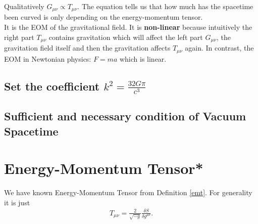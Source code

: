 \documentclass[openany,10pt]{book}
\theoremstyle{definition}
\theoremstyle{definition}
\theoremstyle{remark}
\newcommand{\be}{\begin{eqnarray}}
\newcommand{\ee}{\end{eqnarray}}
\begin{document}
Qualitatively $G_{\mu\nu}\varpropto T_{\mu\nu}$. The equation tells us that how much has the spacetime been curved is only depending on the energy-momentum tensor.\\
It is the EOM of the gravitational field. It is \textbf{non-linear} because intuitively the right part $T_{\mu\nu}$ contains gravitation which will affect the left part $G_{\mu\nu}$, the gravitation field itself and then the gravitation affects $T_{\mu\nu}$ again. In contrast, the EOM in Newtonian physics:  $F=ma$ which is linear.

\subsection[k]{Set the coefficient $k^2=\frac{32G\pi}{c^3}$}


\subsection{Sufficient and necessary condition of Vacuum Spacetime}

\section{Energy-Momentum Tensor*}
We have known Energy-Momentum Tensor from Definition \ref{emt}.
For generality it is just
\be
T_{\mu\nu}=\frac{2}{\sqrt{-g}}\frac{\delta S}{\delta g^{\mu\nu}}.
\ee
\end{document}

